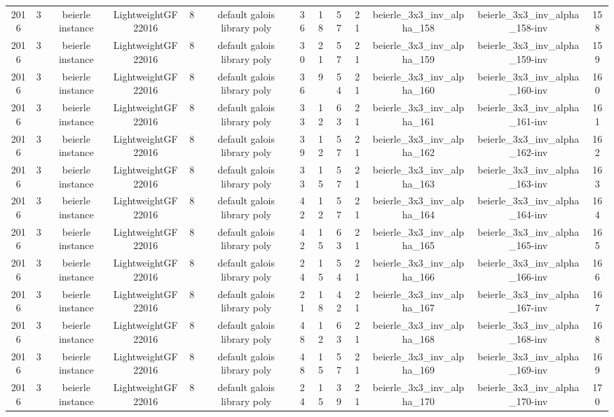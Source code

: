 \begin{tabular}{c c c c c c c c c c c c c}
2016 & 3 & beierle instance & LightweightGF22016 & 8 & default galois library poly & 36 & 18 & 57 & 21 & beierle_3x3_inv_alpha_158 & beierle_3x3_inv_alpha_158-inv & 158 \\
2016 & 3 & beierle instance & LightweightGF22016 & 8 & default galois library poly & 30 & 21 & 57 & 21 & beierle_3x3_inv_alpha_159 & beierle_3x3_inv_alpha_159-inv & 159 \\
2016 & 3 & beierle instance & LightweightGF22016 & 8 & default galois library poly & 36 & 9 & 54 & 21 & beierle_3x3_inv_alpha_160 & beierle_3x3_inv_alpha_160-inv & 160 \\
2016 & 3 & beierle instance & LightweightGF22016 & 8 & default galois library poly & 33 & 12 & 63 & 21 & beierle_3x3_inv_alpha_161 & beierle_3x3_inv_alpha_161-inv & 161 \\
2016 & 3 & beierle instance & LightweightGF22016 & 8 & default galois library poly & 39 & 12 & 57 & 21 & beierle_3x3_inv_alpha_162 & beierle_3x3_inv_alpha_162-inv & 162 \\
2016 & 3 & beierle instance & LightweightGF22016 & 8 & default galois library poly & 33 & 15 & 57 & 21 & beierle_3x3_inv_alpha_163 & beierle_3x3_inv_alpha_163-inv & 163 \\
2016 & 3 & beierle instance & LightweightGF22016 & 8 & default galois library poly & 42 & 12 & 57 & 21 & beierle_3x3_inv_alpha_164 & beierle_3x3_inv_alpha_164-inv & 164 \\
2016 & 3 & beierle instance & LightweightGF22016 & 8 & default galois library poly & 42 & 15 & 63 & 21 & beierle_3x3_inv_alpha_165 & beierle_3x3_inv_alpha_165-inv & 165 \\
2016 & 3 & beierle instance & LightweightGF22016 & 8 & default galois library poly & 24 & 15 & 54 & 21 & beierle_3x3_inv_alpha_166 & beierle_3x3_inv_alpha_166-inv & 166 \\
2016 & 3 & beierle instance & LightweightGF22016 & 8 & default galois library poly & 21 & 18 & 42 & 21 & beierle_3x3_inv_alpha_167 & beierle_3x3_inv_alpha_167-inv & 167 \\
2016 & 3 & beierle instance & LightweightGF22016 & 8 & default galois library poly & 48 & 12 & 63 & 21 & beierle_3x3_inv_alpha_168 & beierle_3x3_inv_alpha_168-inv & 168 \\
2016 & 3 & beierle instance & LightweightGF22016 & 8 & default galois library poly & 48 & 15 & 57 & 21 & beierle_3x3_inv_alpha_169 & beierle_3x3_inv_alpha_169-inv & 169 \\
2016 & 3 & beierle instance & LightweightGF22016 & 8 & default galois library poly & 24 & 15 & 39 & 21 & beierle_3x3_inv_alpha_170 & beierle_3x3_inv_alpha_170-inv & 170 \\

\end{tabular}
